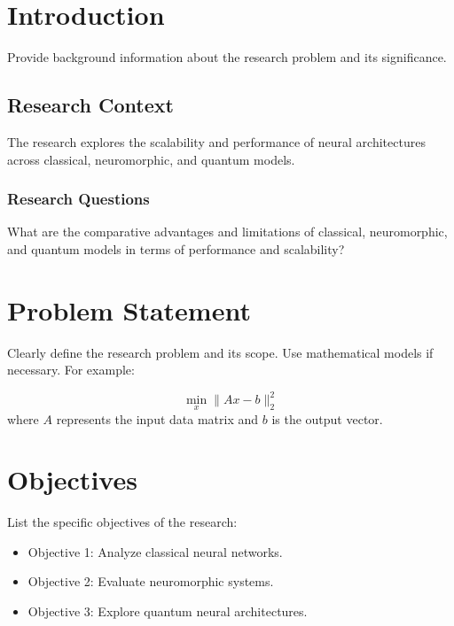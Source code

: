 \documentclass[12pt, a4paper]{report}
\begin{document}
\chapter{Introduction}

\pagestyle{plain} %

Provide background information about the research problem and its significance.


\section{Research Context}
The research explores the scalability and performance of neural architectures across classical, neuromorphic, and quantum models.

\subsection{Research Questions}
What are the comparative advantages and limitations of classical, neuromorphic, and quantum models in terms of performance and scalability?

\chapter{Problem Statement}
Clearly define the research problem and its scope. Use mathematical models if necessary. For example:

\[
    \min_x \|Ax - b\|_2^2
\]
where \(A\) represents the input data matrix and \(b\) is the output vector.

\chapter{Objectives}
List the specific objectives of the research:
\begin{itemize}
    \item Objective 1: Analyze classical neural networks.
    \item Objective 2: Evaluate neuromorphic systems.
    \item Objective 3: Explore quantum neural architectures.
\end{itemize}

\end{document}

